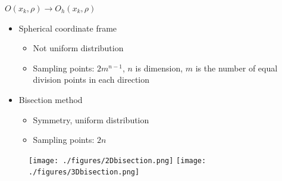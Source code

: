 \documentclass{beamer}
\begin{document}
\begin{frame}{$O(x_k, \rho)\rightarrow O_h(x_k, \rho)$}

	\begin{itemize}
		\item Spherical coordinate frame
		\begin{itemize}
			\item Not uniform distribution
			\item Sampling points: $2m^{n-1}$, $n$ is dimension,
				$m$ is the number of equal division points in
				each direction
		\end{itemize}
	\end{itemize}

	\begin{itemize}
		\item Bisection method
		\begin{itemize}
			\item Symmetry, uniform distribution
			\item Sampling points: $2n$
		\end{itemize}
	\end{itemize}
\begin{figure}[!htbp]
	\centering
	  \texttt{[image: ./figures/2Dbisection.png]}
	  \hspace{1cm}
	  \texttt{[image: ./figures/3Dbisection.png]}
\label{fig:gauss:2drand}
\end{figure}
\end{frame}
\end{document}
